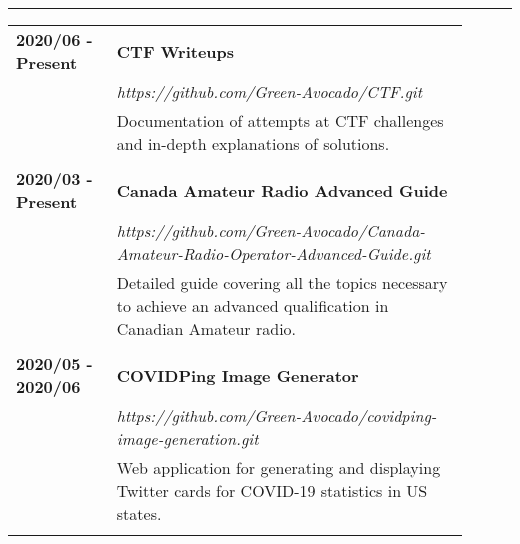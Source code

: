 \documentclass[letterpaper]{article}
\newcommand{\horizontalLine}{%
    \rule{\linewidth}{0.4pt}
    \vspace{1ex}
}
\begin{document}
        \horizontalLine

        \begin{tabular}{p{0.2\linewidth} p{0.7\linewidth}} 
            \textbf{2020/06 - Present} & \large\textbf{CTF Writeups} \\
            & \emph{https://github.com/Green-Avocado/CTF.git} \\
            & Documentation of attempts at CTF challenges and in-depth explanations of solutions. \\
            \\
            \textbf{2020/03 - Present} & \large\textbf{Canada Amateur Radio Advanced Guide} \\
            & \emph{https://github.com/Green-Avocado/Canada-Amateur-Radio-Operator-Advanced-Guide.git} \\
            & Detailed guide covering all the topics necessary to achieve an advanced qualification in Canadian Amateur radio. \\
            \\
            \textbf{2020/05 - 2020/06} & \large\textbf{COVIDPing Image Generator} \\
            & \emph{https://github.com/Green-Avocado/covidping-image-generation.git} \\
            & Web application for generating and displaying Twitter cards for COVID-19 statistics in US states. \\
            \\
        \end{tabular}
\end{document}
